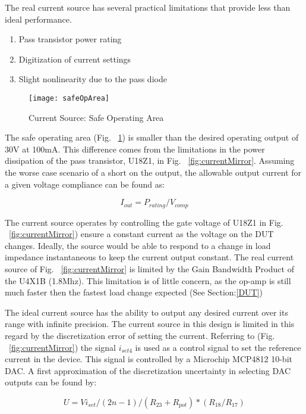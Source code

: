 The real current source has several practical limitations that provide less than ideal performance. 

\begin{enumerate}
\item Pass transistor power rating
\item Digitization of current settings
\item Slight nonlinearity due to the pass diode
\end{enumerate}


\begin{figure}[here]
\centering
\texttt{[image: safeOpArea]}
\caption{Current Source: Safe Operating Area}
\label{fig:safeOpArea}
\end{figure}

The safe operating area (Fig.  ~\ref{fig:safeOpArea}) is smaller than the desired operating output of 30V at 100mA. This difference comes from the limitations in the power dissipation of the pass transistor, U18Z1, in Fig. ~\ref{fig:currentMirror}. Assuming the worse case scenario of a short on the output, the allowable output current for a given voltage compliance can be found as:

\begin{equation}
I_{out} = P_{rating} / V_{comp}
\end{equation}

The current source operates by controlling the gate voltage of U18Z1 in Fig. ~\ref{fig:currentMirror}) ensure a constant current as the voltage on the DUT changes. Ideally, the source would be able to respond to a change in load impedance instantaneous to keep the current output constant. The real current source of Fig. ~\ref{fig:currentMirror} is limited by the Gain Bandwidth Product of the U4X1B (1.8Mhz). This limitation is of little concern, as the op-amp is still much faster then the fastest load change expected (See Section:\ref{DUT})

The ideal current source has the ability to output any desired current over its range with infinite precision. The current source in this design is limited in this regard by the discretization error of setting the current. Referring to (Fig. ~\ref{fig:currentMirror}) the signal $i_{set4}$ is used as a control signal to set the reference current in the device. This signal is controlled by a Microchip MCP4812 10-bit DAC. A first approximation of the discretization uncertainty in selecting DAC outputs can be found by:


\begin{equation}
U = Vi_{set} /(2n-1) / (R_{23} + R_{pot}) *(R_{18}/R_{17})
\end{equation}


